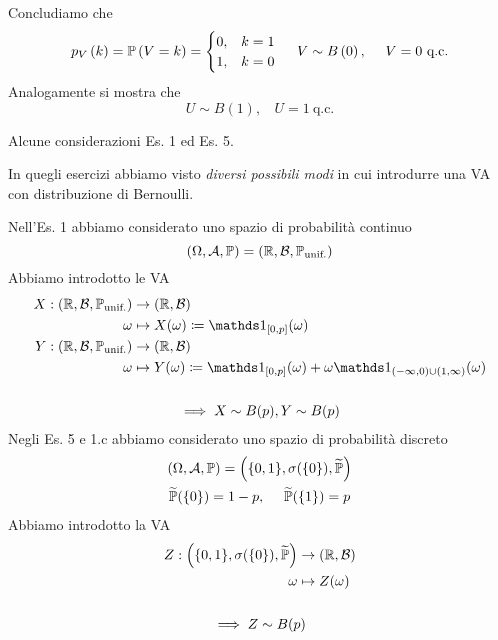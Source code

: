 \begin{enumerate}
Concludiamo che
\begin{equation*}
p_{V}\left(k\right) =\mathbb{P}\left(V=k\right) =
\begin{cases}
0, & k=1\\
1, & k=0
\end{cases}
 \ \ \ \ V\sim B\left(0\right) ,\ \ \ \ V=0\ \text{q.c.}
\end{equation*}
Analogamente si mostra che
\begin{equation*}
U\sim B(1) ,\ \ \ \ U=1\ \text{q.c.}
\end{equation*}
\end{enumerate}
\begin{rem}
Alcune considerazioni Es. 1 ed Es. 5.

In quegli esercizi abbiamo visto \textit{diversi possibili modi} in cui introdurre una VA con distribuzione di Bernoulli.

Nell'Es. 1 abbiamo considerato uno spazio di probabilità continuo
\begin{equation*}
(\Omega,\mathcal{A},\mathbb{P}) =(\mathbb{R} ,\mathcal{B} ,\mathbb{P}_{\text{unif.}})
\end{equation*}
Abbiamo introdotto le VA
\begin{gather*}
\begin{aligned}
X:(\RR ,\mathcal{B} ,\PP_{\text{unif.}}) & \rightarrow (\RR ,\mathcal{B})\\
\omega  & \mapsto X(\omega) \coloneqq \Ind_{[0,p]}(\omega)\\
Y:(\RR ,\mathcal{B} ,\PP_{\text{unif.}}) & \rightarrow (\RR ,\mathcal{B})\\
\omega  & \mapsto Y(\omega) \coloneqq \Ind_{[0,p]}(\omega) +\omega \Ind_{(-\infty ,0) \cup (1,\infty)}(\omega)
\end{aligned}\\
\ \\
\implies X\sim B(p) ,Y\sim B(p)
\end{gather*}
Negli Es. 5 e 1.c abbiamo considerato uno spazio di probabilità discreto
\begin{gather*}
(\Omega,\mathcal{A},\mathbb{P}) =\left(\{0,1\} ,\sigma (\{0\}) ,\widetilde{\mathbb{P}}\right)\\
\widetilde{\mathbb{P}}(\{0\}) =1-p,\ \ \ \ \widetilde{\mathbb{P}}(\{1\}) =p
\end{gather*}
Abbiamo introdotto la VA
\begin{gather*}
\begin{aligned}
Z:\left(\{0,1\} ,\sigma (\{0\}) ,\widetilde{\mathbb{P}}\right) & \rightarrow (\mathbb{R} ,\mathcal{B})\\
\omega  & \mapsto Z(\omega)
\end{aligned}\\
\\
\implies Z\sim B(p)
\end{gather*}
\end{rem}

